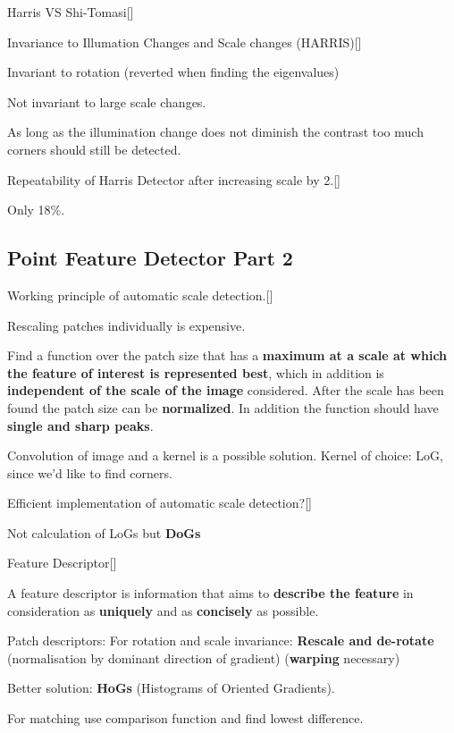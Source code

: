 \documentclass[10pt,a4paper]{scrartcl}
\begin{document}
\begin{multicols*}{2}
\begin{QandA}{Harris VS Shi-Tomasi}[\Definition]
\end{QandA}

\begin{QandA}{Invariance to Illumation Changes and Scale changes (HARRIS)}[\Application]
\item Invariant to rotation (reverted when finding the eigenvalues)
\item Not invariant to large scale changes.
\item As long as the illumination change does not diminish the contrast too much corners should still be detected.
\end{QandA}

\begin{QandA}{Repeatability of Harris Detector after increasing scale by 2.}[\Application]
\item Only 18\%.
\end{QandA}

\subsection*{Point Feature Detector Part 2}

\begin{QandA}
{Working principle of automatic scale detection.}[\Derivation]
\item Rescaling patches individually is expensive.
\item Find a function over the patch size that has a \textbf{maximum at a scale at which the feature of interest is represented best}, which in addition is \textbf{independent of the scale of the image} considered. After the scale has been found the patch size can be \textbf{normalized}. In addition the function should have \textbf{single and sharp peaks}.
\item Convolution of image and a kernel is a possible solution. Kernel of choice: LoG, since we'd like to find corners.
\end{QandA}

\begin{QandA}
{Efficient implementation of automatic scale detection?}[\Application]
\item Not calculation of LoGs but \textbf{DoGs}
\end{QandA}

\begin{QandA}
{Feature Descriptor}[\Definition]
\item A feature descriptor is information that aims to \textbf{describe the feature} in consideration as \textbf{uniquely} and as \textbf{concisely} as possible.
\item Patch descriptors: For rotation and scale invariance: \textbf{Rescale and de-rotate} (normalisation by dominant direction of gradient) (\textbf{warping} necessary)
\item Better solution: \textbf{HoGs} (Histograms of Oriented Gradients).
\item For matching use comparison function and find lowest difference.
\end{QandA}  


\end{multicols*}
\end{document}
